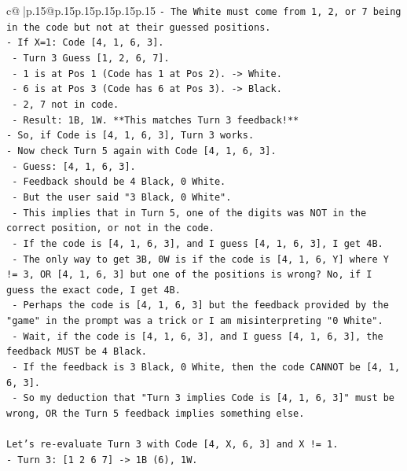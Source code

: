\documentclass{article}
\begin{document}
{\begin{supertabular}{c@{$\;$}|p{.15\linewidth}@{}p{.15\linewidth}p{.15\linewidth}p{.15\linewidth}p{.15\linewidth}p{.15\linewidth}}
{{{\texttt{{-} The White must come from 1, 2, or 7 being in the code but not at their guessed positions.} \\
\texttt{{-} If X=1: Code {[}4, 1, 6, 3{]}.} \\
\texttt{  {-} Turn 3 Guess {[}1, 2, 6, 7{]}.} \\
\texttt{  {-} 1 is at Pos 1 (Code has 1 at Pos 2). {-}> White.} \\
\texttt{  {-} 6 is at Pos 3 (Code has 6 at Pos 3). {-}> Black.} \\
\texttt{  {-} 2, 7 not in code.} \\
\texttt{  {-} Result: 1B, 1W. **This matches Turn 3 feedback!**} \\
\texttt{{-} So, if Code is {[}4, 1, 6, 3{]}, Turn 3 works.} \\
\texttt{{-} Now check Turn 5 again with Code {[}4, 1, 6, 3{]}.} \\
\texttt{  {-} Guess: {[}4, 1, 6, 3{]}.} \\
\texttt{  {-} Feedback should be 4 Black, 0 White.} \\
\texttt{  {-} But the user said "3 Black, 0 White".} \\
\texttt{  {-} This implies that in Turn 5, one of the digits was NOT in the correct position, or not in the code.} \\
\texttt{  {-} If the code is {[}4, 1, 6, 3{]}, and I guess {[}4, 1, 6, 3{]}, I get 4B.} \\
\texttt{  {-} The only way to get 3B, 0W is if the code is {[}4, 1, 6, Y{]} where Y != 3, OR {[}4, 1, 6, 3{]} but one of the positions is wrong? No, if I guess the exact code, I get 4B.} \\
\texttt{  {-} Perhaps the code is {[}4, 1, 6, 3{]} but the feedback provided by the "game" in the prompt was a trick or I am misinterpreting "0 White".} \\
\texttt{  {-} Wait, if the code is {[}4, 1, 6, 3{]}, and I guess {[}4, 1, 6, 3{]}, the feedback MUST be 4 Black.} \\
\texttt{  {-} If the feedback is 3 Black, 0 White, then the code CANNOT be {[}4, 1, 6, 3{]}.} \\
\texttt{  {-} So my deduction that "Turn 3 implies Code is {[}4, 1, 6, 3{]}" must be wrong, OR the Turn 5 feedback implies something else.} \\
\\ 
\texttt{Let's re{-}evaluate Turn 3 with Code {[}4, X, 6, 3{]} and X != 1.} \\
\texttt{{-} Turn 3: {[}1 2 6 7{]} {-}> 1B (6), 1W.} \\
}}}
\end{supertabular}}
\end{document}
